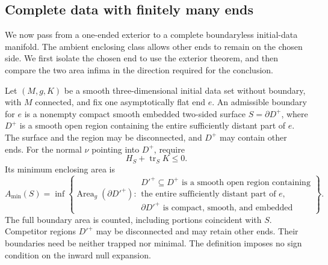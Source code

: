 \subsection{Complete data with finitely many ends}

We now pass from a one-ended exterior to a complete boundaryless
initial-data manifold. The ambient enclosing class allows other ends
to remain on the chosen side. We first isolate the chosen end to use
the exterior theorem, and then compare the two area infima in the
direction required for the conclusion.

\begin{definition}
\label{bridge:intro:global-admissible}
Let $(M,g,K)$ be a smooth three-dimensional initial data set without
boundary, with $M$ connected, and fix one asymptotically flat end $e$.
An admissible boundary for $e$ is a
nonempty compact smooth embedded two-sided surface $S=\partial D^+$,
where $D^+$ is a smooth open region containing the entire sufficiently
distant part of $e$. The surface and the region may be disconnected,
and $D^+$ may contain other ends. For the normal $\nu$ pointing into
$D^+$, require
\[
                  H_S+\operatorname{tr}_S K\le0.
\]
Its minimum enclosing area is
\begin{equation}
\label{bridge:intro:global-area}
 A_{\min}(S)=\inf\left\{
 \operatorname{Area}_g(\partial D'^+):
 \begin{array}{l}
 D'^+\subseteq D^+\text{ is a smooth open region containing}\\
 \text{the entire sufficiently distant part of }e,\\
 \partial D'^+\text{ is compact, smooth, and embedded}
 \end{array}\right\}.
\end{equation}
The full boundary area is counted, including portions coincident
with $S$. Competitor regions $D'^+$ may be disconnected and may retain
other ends. Their boundaries need be neither trapped nor minimal.
The definition imposes no sign condition on the inward null expansion.
\end{definition}

